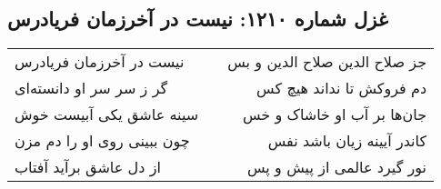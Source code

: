 \begin{center}
\section*{غزل شماره ۱۲۱۰: نیست در آخرزمان فریادرس}
\label{sec:1210}
\begin{longtable}{l p{0.5cm} r}
نیست در آخرزمان فریادرس
&&
جز صلاح الدین صلاح الدین و بس
\\
گر ز سر سر او دانسته‌ای
&&
دم فروکش تا نداند هیچ کس
\\
سینه عاشق یکی آبیست خوش
&&
جان‌ها بر آب او خاشاک و خس
\\
چون ببینی روی او را دم مزن
&&
کاندر آیینه زیان باشد نفس
\\
از دل عاشق برآید آفتاب
&&
نور گیرد عالمی از پیش و پس
\\
\end{longtable}
\end{center}
